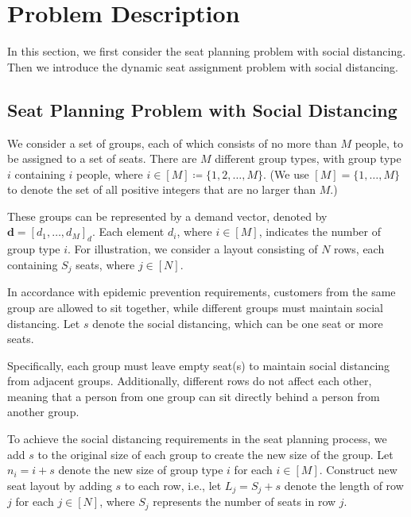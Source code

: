 \section{Problem Description}
In this section, we first consider the seat planning problem with social distancing. Then we introduce the dynamic seat assignment problem with social distancing.





\subsection{Seat Planning Problem with Social Distancing}\label{dynamic_demand}
We consider a set of groups, each of which consists of no more than $M$ people, to be assigned to a set of seats. There are $M$ different group types, with group type $i$ containing $i$ people, where $i \in [M] \coloneqq \{1,2, \ldots, M\}$. (We use $[M] = \{1, \ldots, M\}$ to denote the set of all positive integers that are no larger than $M$.)

These groups can be represented by a demand vector, denoted by $\mathbf{d} = [d_1, \ldots, d_M]_d$. Each element $d_i$, where $i \in [M]$, indicates the number of group type $i$. For illustration, we consider a layout consisting of $N$ rows, each containing $S_j$ seats, where $j \in [N]$.

In accordance with epidemic prevention requirements, customers from the same group are allowed to sit together, while different groups must maintain social distancing. Let $s$ denote the social distancing, which can be one seat or more seats.

Specifically, each group must leave empty seat(s) to maintain social distancing from adjacent groups. Additionally, different rows do not affect each other, meaning that a person from one group can sit directly behind a person from another group.



To achieve the social distancing requirements in the seat planning process, we add $s$ to the original size of each group to create the new size of the group. Let $n_i = i + s$ denote the new size of group type $i$ for each $i \in [M]$. Construct new seat layout by adding $s$ to each row, i.e., let $L_j = S_j + s$ denote the length of row $j$ for each $j \in [N]$, where $S_j$ represents the number of seats in row $j$.


